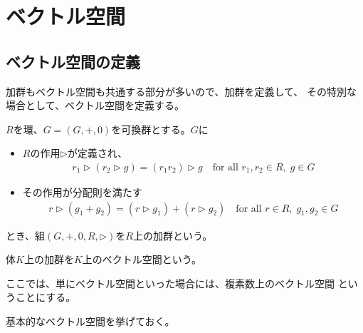 \begingroup %
	\newcommand{\Hom}{\myop{Hom}}
	\newcommand{\End}{\myop{End}}
	\newcommand{\Auto}{\myop{Auto}}
	\newcommand{\Pow}{\mycal{P}}
	\newcommand{\id}{\myop{id}}
	\newcommand{\onto}{\myop{onto}}
	\newcommand{\im}{\myop{im}}
	\newcommand{\spanall}{\myop{span}}
	\newcommand{\rank}{\myop{rank}}
	\newcommand{\ofm}{only finitely many }

\section{ベクトル空間}\label{s1:ベクトル空間} %
\subsection{ベクトル空間の定義}\label{s2:ベクトル空間の定義} %
	加群もベクトル空間も共通する部分が多いので、加群を定義して、
	その特別な場合として、ベクトル空間を定義する。

	\begin{definition}[加群]\label{def:加群} %
		$R$を環、$G=(G,+,0)$を可換群とする。$G$に
		\begin{itemize}\setlength{\itemsep}{-1mm} %
			\item $R$の作用$\rhd$が定義され、
			\begin{equation*}\begin{split}
				r_1\rhd(r_2\rhd g) = (r_1r_2)\rhd g
				\quad\text{for all }r_1,r_2\in R,\;g\in G
			\end{split}\end{equation*}
			\item その作用が分配則を満たす
			\begin{equation*}\begin{split}
				r\rhd(g_1 + g_2) = (r\rhd g_1) + (r\rhd g_2)
				\quad\text{for all }r\in R,\;g_1,g_2\in G
			\end{split}\end{equation*}
		\end{itemize} %
		とき、組$(G,+,0,R,\rhd)$を$R$上の加群という。
	\end{definition} %

	\begin{definition}[ベクトル空間]\label{def:ベクトル空間} %
		体$K$上の加群を$K$上のベクトル空間という。
	\end{definition} %

	ここでは、単にベクトル空間といった場合には、複素数上のベクトル空間
	ということにする。

	基本的なベクトル空間を挙げておく。

